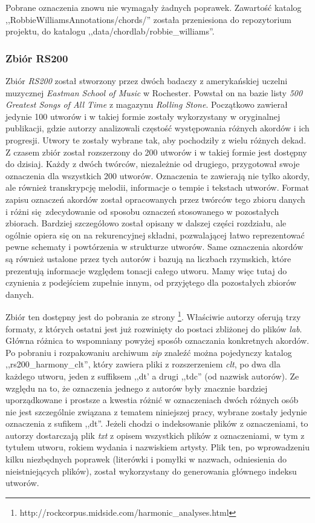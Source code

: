 Pobrane oznaczenia znowu nie wymagały żadnych poprawek. Zawartość katalog
,,RobbieWilliamsAnnotations/chords/'' została przeniesiona do repozytorium projektu, do katalogu
,,data/chordlab/robbie\_williams''.

\subsubsection{Zbiór RS200}

Zbiór \emph{RS200} \cite{de_clercq_corpus_2011} został stworzony przez dwóch badaczy z amerykańskiej
uczelni muzycznej \emph{Eastman School of Music} w Rochester. Powstał on na bazie listy \emph{500
Greatest Songs of All Time} z magazynu \emph{Rolling Stone}. Początkowo zawierał jedynie 100 utworów i w
takiej formie zostały wykorzystany w oryginalnej publikacji, gdzie autorzy analizowali częstość
występowania różnych akordów i ich progresji. Utwory te zostały wybrane tak, aby pochodziły z wielu
różnych dekad. Z czasem zbiór został rozszerzony do 200 utworów i w takiej formie jest dostępny do
dzisiaj. Każdy z dwóch twórców, niezależnie od drugiego, przygotował swoje oznaczenia dla wszystkich
200 utworów. Oznaczenia te zawierają nie tylko akordy, ale również transkrypcję melodii, informacje
o tempie i tekstach utworów. Format zapisu oznaczeń akordów został opracowanych przez twórców tego
zbioru danych i różni się zdecydowanie od sposobu oznaczeń stosowanego w pozostałych zbiorach.
Bardziej szczegółowo został opisany w dalszej części rozdziału, ale ogólnie opiera się on na
rekurencyjnej składni, pozwalającej łatwo reprezentować pewne schematy i powtórzenia w strukturze
utworów. Same oznaczenia akordów są również ustalone przez tych autorów i bazują na liczbach
rzymskich, które prezentują informacje względem tonacji całego utworu. Mamy więc tutaj do
czynienia z podejściem zupełnie innym, od przyjętego dla pozostałych zbiorów danych.

Zbiór ten dostępny jest do pobrania ze strony
\footnote{http://rockcorpus.midside.com/harmonic\_analyses.html}. Właściwie autorzy oferują trzy
formaty, z których ostatni jest już rozwinięty do postaci zbliżonej do plików \emph{lab}. Główna
różnica to wspomniany powyżej sposób oznaczania konkretnych akordów. Po pobraniu i rozpakowaniu archiwum
\emph{zip} znaleźć można pojedynczy katalog ,,rs200\_harmony\_clt'', który zawiera pliki z
rozszerzeniem \emph{clt}, po dwa dla każdego utworu, jeden z suffiksem ,,dt' a drugi ,,tdc'' (od
nazwisk autorów). Ze względu na to, że oznaczenia jednego z autorów były znacznie bardziej
uporządkowane i prostsze a kwestia różnić w oznaczeniach dwóch różnych osób nie jest szczególnie
związana z tematem niniejszej pracy, wybrane zostały jedynie oznaczenia z sufikem ,,dt''. Jeżeli
chodzi o indeksowanie plików z oznaczeniami, to autorzy dostarczają plik \emph{txt} z opisem
wszystkich plików z oznaczeniami, w tym z tytułem utworu, rokiem wydania i nazwiskiem artysty. Plik
ten, po wprowadzeniu kilku niezbędnych poprawek (literówki i pomyłki w nazwach, odniesienia do
nieistniejących plików), został wykorzystany do generowania głównego indeksu utworów.

